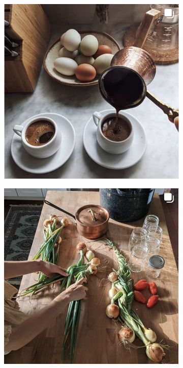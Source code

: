 \documentclass[12pt,letterpaper]{article}
\begin{document}
\begin{figure}[!t] %
     \centering
     \begin{subfigure}[b]{0.45\textwidth}
         \centering
         \includegraphics[width=\textwidth]{img_1.png}
         \caption{}
         \label{fig:img-1}
     \end{subfigure}
     \hfill
     \begin{subfigure}[b]{0.45\textwidth}
         \centering
         \includegraphics[width=\textwidth]{img_2.png}

\end{subfigure}
\end{figure}
\end{document}
